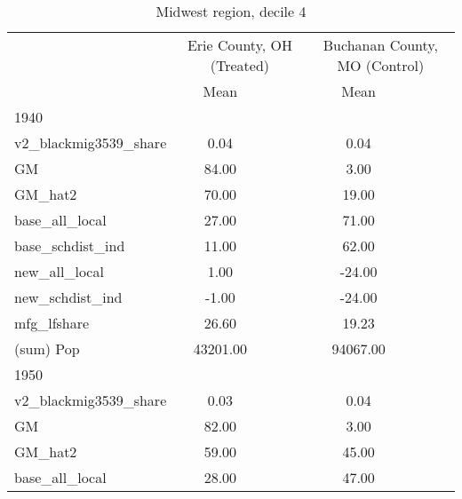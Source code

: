 \begin{table}[htbp]\centering
\def\sym#1{\ifmmode^{#1}\else\(^{#1}\)\fi}
\caption{Midwest region, decile 4 \label{tab1}}
\begin{tabular}{l*{2}{ccc}}
\toprule
                    &\multicolumn{3}{c}{Erie County, OH (Treated)}&\multicolumn{3}{c}{Buchanan County, MO (Control)}\\
                    &        Mean&            &            &        Mean&            &            \\
\midrule
1940                &            &            &            &            &            &            \\
v2\_blackmig3539\_share&        0.04&            &            &        0.04&            &            \\
GM                  &       84.00&            &            &        3.00&            &            \\
GM\_hat2             &       70.00&            &            &       19.00&            &            \\
base\_all\_local      &       27.00&            &            &       71.00&            &            \\
base\_schdist\_ind    &       11.00&            &            &       62.00&            &            \\
new\_all\_local       &        1.00&            &            &      -24.00&            &            \\
new\_schdist\_ind     &       -1.00&            &            &      -24.00&            &            \\
mfg\_lfshare         &       26.60&            &            &       19.23&            &            \\
(sum) Pop           &    43201.00&            &            &    94067.00&            &            \\
\midrule
1950                &            &            &            &            &            &            \\
v2\_blackmig3539\_share&        0.03&            &            &        0.04&            &            \\
GM                  &       82.00&            &            &        3.00&            &            \\
GM\_hat2             &       59.00&            &            &       45.00&            &            \\
base\_all\_local      &       28.00&            &            &       47.00&            &            \\

\end{tabular}
\end{table}
